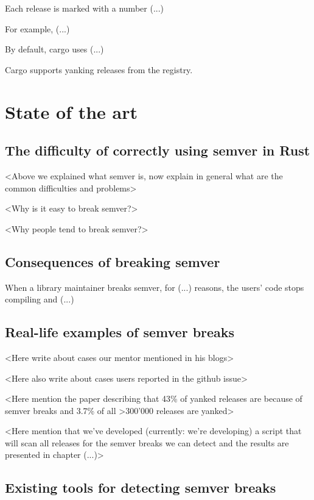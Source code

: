 \documentclass[licencjacka,en]{pracamgr}
\begin{document}
Each release is marked with a number (...)

For example, (...)

By default, cargo uses (...)

Cargo supports yanking releases from the registry.



\chapter{State of the art}\label{r:stateoftheart}

\section{The difficulty of correctly using semver in Rust}\label{r:semverisdifficult}

<Above we explained what semver is, now explain in general what are the common difficulties and problems>

<Why is it easy to break semver?>

<Why people tend to break semver?>

\section{Consequences of breaking semver}

When a library maintainer breaks semver, for (...) reasons, the users' code stops compiling and (...)


\section{Real-life examples of semver breaks}

<Here write about cases our mentor mentioned in his blogs>

<Here also write about cases users reported in the github issue>

<Here mention the paper describing that 43\% of yanked releases
are because of semver breaks and 3.7\% of all >300'000 releases are yanked>

<Here mention that we've developed (currently: we're developing)
a script that will scan all releases for the semver breaks
we can detect and the results are presented in chapter (...)>


\section{Existing tools for detecting semver breaks}
\end{document}
